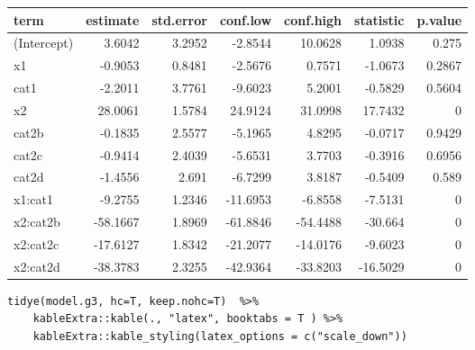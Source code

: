 \documentclass[a4paper]{article}
\begin{document}
\begin{center}
\begin{tabular}{lrrrrrr}
term & estimate & std.error & conf.low & conf.high & statistic & p.value\\
\hline
(Intercept) & 3.6042 & 3.2952 & -2.8544 & 10.0628 & 1.0938 & 0.275\\
x1 & -0.9053 & 0.8481 & -2.5676 & 0.7571 & -1.0673 & 0.2867\\
cat1 & -2.2011 & 3.7761 & -9.6023 & 5.2001 & -0.5829 & 0.5604\\
x2 & 28.0061 & 1.5784 & 24.9124 & 31.0998 & 17.7432 & 0\\
cat2b & -0.1835 & 2.5577 & -5.1965 & 4.8295 & -0.0717 & 0.9429\\
cat2c & -0.9414 & 2.4039 & -5.6531 & 3.7703 & -0.3916 & 0.6956\\
cat2d & -1.4556 & 2.691 & -6.7299 & 3.8187 & -0.5409 & 0.589\\
x1:cat1 & -9.2755 & 1.2346 & -11.6953 & -6.8558 & -7.5131 & 0\\
x2:cat2b & -58.1667 & 1.8969 & -61.8846 & -54.4488 & -30.664 & 0\\
x2:cat2c & -17.6127 & 1.8342 & -21.2077 & -14.0176 & -9.6023 & 0\\
x2:cat2d & -38.3783 & 2.3255 & -42.9364 & -33.8203 & -16.5029 & 0\\
\end{tabular}
\end{center}


\lstset{numbers=left,language=r,label= ,caption= ,captionpos=b}
\begin{lstlisting}
tidye(model.g3, hc=T, keep.nohc=T)  %>%
    kableExtra::kable(., "latex", booktabs = T ) %>%
    kableExtra::kable_styling(latex_options = c("scale_down"))

\end{lstlisting}
\end{document}
